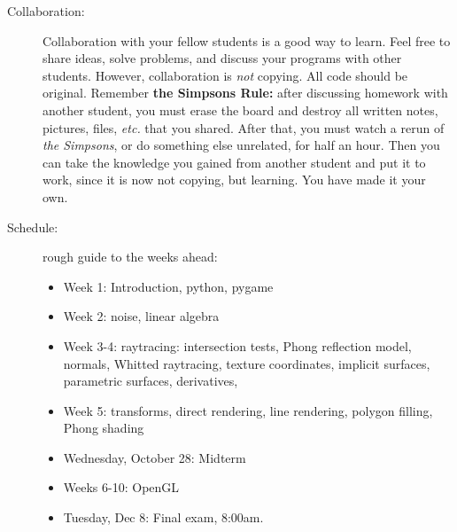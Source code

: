 \documentclass[]{article}
\begin{document}
\begin{description}
\item[Collaboration:] Collaboration with your fellow students is a
  good way to learn.  Feel free to share ideas, solve problems, and
  discuss your programs with other students.  However, collaboration
  is {\em not} copying.  All code should be original.  Remember {\bf
    the Simpsons Rule:} after discussing homework with another
  student, you must erase the board and destroy all written notes,
  pictures, files, {\em etc.} that you shared.  After that, you must
  watch a rerun of {\em the Simpsons}, or do something else
  unrelated, for half an hour.  Then you can take the knowledge you
  gained from another student and put it to work, since it is now not
  copying, but learning.  You have made it your own.

\item[Schedule:]  rough guide to the weeks ahead:
  \begin{itemize}
\item Week 1: Introduction, python, pygame
\item Week 2: noise, linear algebra
\item Week 3-4: raytracing: intersection tests, Phong reflection
  model, normals, Whitted raytracing, texture coordinates, implicit
  surfaces, parametric surfaces, derivatives, 
\item Week 5:     transforms, direct rendering, line rendering,
  polygon filling, Phong shading
\item Wednesday, October 28:     Midterm
\item Weeks 6-10:       OpenGL
\item Tuesday, Dec 8:  Final exam, 8:00am.
\end{itemize}


\end{description}
\end{document}
